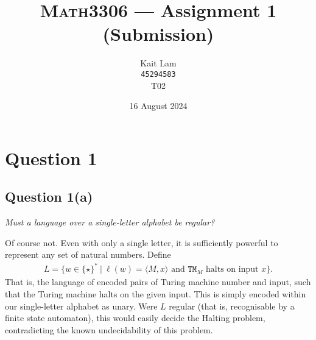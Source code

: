 \documentclass[a4paper]{article}
\author{Kait Lam \\ \small \texttt{45294583} \\ \small {T02}}
\title{\textsc{Math3306} --- Assignment 1 (Submission)}
\date{16 August 2024}
\begin{document}
\maketitle


\section*{Question 1}
\subsection*{Question 1(a)}
\begin{center}
  \textit{Must a language over a single-letter alphabet be regular?}
\end{center}
Of course not.
Even with only a single letter, it is sufficiently powerful to represent any set of natural numbers.
Define
\begin{align*}
  L = \{w \in \{\star\}^* ~|~ \ell(w) = \langle M, x \rangle \text{ and } \texttt{TM}_M\text{ halts on input }x\}.
\end{align*}
That is, the language of encoded pairs of Turing machine number and input, such that the Turing machine halts on the given
input.
This is simply encoded within our single-letter alphabet as unary.
Were $L$ regular (that is, recognisable by a finite state automaton), this would easily decide the Halting problem,
contradicting the known undecidability of this problem.

\end{document}
